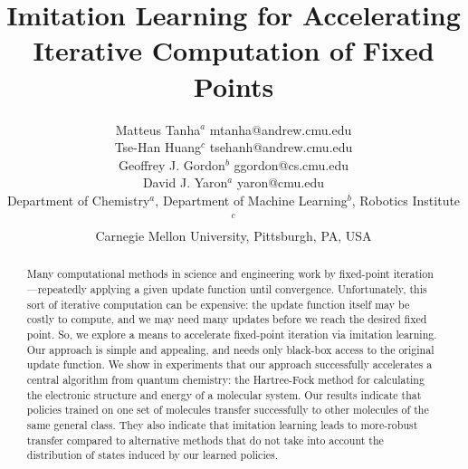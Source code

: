 \documentclass[twoside,11pt]{article}
\begin{document}
\title{Imitation Learning for Accelerating Iterative Computation of Fixed Points}


\author{\name Matteus Tanha$^a$ \email mtanha@andrew.cmu.edu \\
\name Tse-Han Huang$^c$ \email tsehanh@andrew.cmu.edu \\
\name Geoffrey J. Gordon$^b$ \email ggordon@cs.cmu.edu \\
\name David J. Yaron$^a$ \email yaron@cmu.edu\\
       \addr Department of Chemistry$^a$, Department of Machine Learning$^b$,
       Robotics Institute$^c$\\
       Carnegie Mellon University,
       Pittsburgh, PA, USA}
\editor{ }

\maketitle


\begin{abstract}%
Many computational methods in science and engineering work by fixed-point iteration---repeatedly applying a given update function until convergence.  Unfortunately, this sort of iterative computation can be expensive: the update function itself may be costly to compute, and we may need many updates before we reach the desired fixed point. So, we explore a means to accelerate fixed-point iteration via imitation learning. Our approach is simple and appealing, and needs only black-box access to the original update function. We show in experiments that our approach successfully accelerates a central algorithm from quantum chemistry: the Hartree-Fock method for calculating the electronic structure and energy of a molecular system. Our results indicate that policies trained on one set of molecules transfer successfully to other molecules of the same general class. They also indicate that imitation learning leads to more-robust transfer compared to alternative methods that do not take into account the distribution of states induced by our learned policies.
%
\end{abstract}
\end{document}

